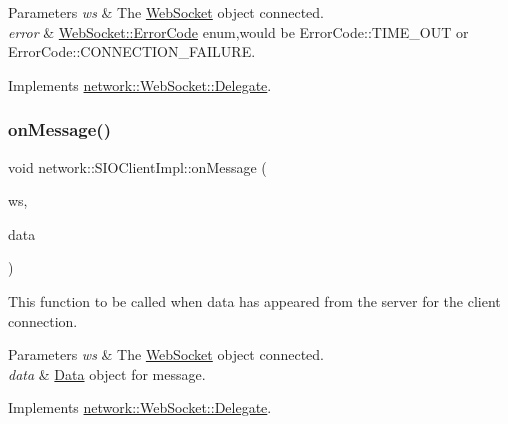 \begin{DoxyParams}{Parameters}
{\em ws} & The \hyperlink{classnetwork_1_1WebSocket}{Web\+Socket} object connected. \\
\hline
{\em error} & \hyperlink{classnetwork_1_1WebSocket_a33c111a23355ac485e3a56c9d0ab9a59}{Web\+Socket\+::\+Error\+Code} enum,would be Error\+Code\+::\+T\+I\+M\+E\+\_\+\+O\+UT or Error\+Code\+::\+C\+O\+N\+N\+E\+C\+T\+I\+O\+N\+\_\+\+F\+A\+I\+L\+U\+RE. \\
\hline
\end{DoxyParams}


Implements \hyperlink{classnetwork_1_1WebSocket_1_1Delegate_a0ed2d5dde9abc2901f387b7274221dc4}{network\+::\+Web\+Socket\+::\+Delegate}.

\mbox{\label{classnetwork_1_1SIOClientImpl_a73369054407916b5a13c9e4c0501d547}} 
\subsubsection{\texorpdfstring{on\+Message()}{onMessage()}\hspace{0.1cm}{\footnotesize\ttfamily [1/2]}}
{\footnotesize\ttfamily void network\+::\+S\+I\+O\+Client\+Impl\+::on\+Message (\begin{DoxyParamCaption}\item[{\hyperlink{classnetwork_1_1WebSocket}{Web\+Socket} $\ast$}]{ws,  }\item[{const \hyperlink{structnetwork_1_1WebSocket_1_1Data}{Web\+Socket\+::\+Data} \&}]{data }\end{DoxyParamCaption})\hspace{0.3cm}{\ttfamily [virtual]}}

This function to be called when data has appeared from the server for the client connection.


\begin{DoxyParams}{Parameters}
{\em ws} & The \hyperlink{classnetwork_1_1WebSocket}{Web\+Socket} object connected. \\
\hline
{\em data} & \hyperlink{classData}{Data} object for message. \\
\hline
\end{DoxyParams}


Implements \hyperlink{classnetwork_1_1WebSocket_1_1Delegate_a879c2f96e39ce8d68e4fbc2827ea4377}{network\+::\+Web\+Socket\+::\+Delegate}.

